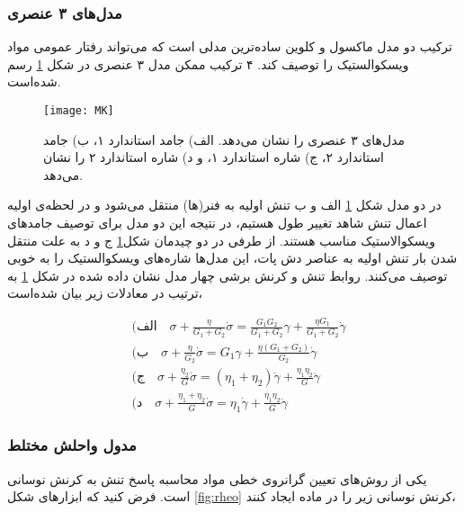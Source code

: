 \subsubsection{مدل‌های ۳ عنصری}
ترکیب دو مدل ماکسول و کلوین ساده‌ترین مدلی است که می‌تواند رفتار عمومی مواد ویسکوالستیک را توصیف کند. ۴ ترکیب ممکن مدل ۳ عنصری در شکل \ref{fig:MK} رسم شده‌است.
\begin{figure}[htbp]
\begin{center}
\texttt{[image: MK]}
\caption{
مدل‌های ۳ عنصری را نشان می‌دهد. الف) جامد استاندارد ۱، ب) جامد استاندارد ۲، ج) شاره استاندارد ۱، و د) شاره استاندارد ۲ را نشان می‌دهد.
}
\label{fig:MK}
\end{center}
\end{figure}
در دو مدل‌ شکل \ref{fig:MK} الف و ب   تنش اولیه به فنر(ها) منتقل می‌شود و در لحظه‌ی اولیه اعمال تنش شاهد تغییر طول هستیم، در نتیجه این دو مدل برای توصیف جامدهای ویسکوالاستیک مناسب هستند. از طرفی در دو چیدمان شکل\ref{fig:MK} ج و د به علت منتقل شدن بار تنش اولیه به عناصر دش پات، این مدل‌ها شاره‌های ویسکوالستیک را به خوبی توصیف می‌کنند. روابط تنش و کرنش برشی چهار مدل نشان داده شده در شکل \ref{fig:MK} به ترتیب در معادلات زیر بیان شده‌است،

\begin{equation*}
\begin{aligned}
& \text{(الف} \quad \sigma+\frac{\eta}{G_1+G_2}\dot\sigma= \frac{G_1G_2}{G_1+G_2}\gamma+\frac{\eta G_1}{G_1+G_2}\dot\gamma\\
& \text{(ب} \quad \sigma+\frac{\eta}{G_2}\dot\sigma= G_1\gamma+\frac{\eta (G_1+G_2)}{G_2}\dot\gamma\\
& \text{(ج} \quad \sigma+\frac{\eta_2}{G}\dot\sigma= (\eta_1+\eta_2)\dot\gamma+\frac{\eta_1\eta_2}{G}\ddot\gamma\\
& \text{(د} \quad \sigma+\frac{\eta_1+\eta_2}{G}\dot\sigma= \eta_1\dot\gamma+\frac{\eta_1\eta_2}{G}\ddot\gamma
\end{aligned}
\end{equation*}


\subsubsection{مدول واحلش مختلط}
یکی از روش‌های تعیین گرانروی خطی مواد محاسبه پاسخ تنش به کرنش نوسانی‌ است. فرض کنید که ابزارهای شکل \ref{fig:rheo} کرنش نوسانی زیر را در ماده ایجاد کنند،

